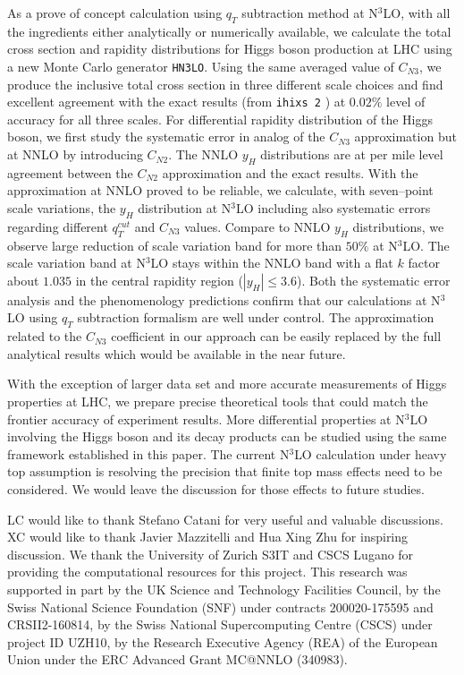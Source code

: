 \documentclass[12pt]{article}
\begin{document}
As a prove of concept calculation using $q_T$ subtraction method at N$^3$LO, with all the ingredients either analytically or numerically available, we calculate the total cross section and rapidity distributions for Higgs boson production at LHC using a new Monte Carlo generator \texttt{HN3LO}. Using the same averaged value of $C_{N3}$, we produce the inclusive total cross section in three different scale choices and find excellent agreement with the exact results (from \texttt{ihixs 2} \cite{Dulat:2018rbf})  at $0.02\%$ level of accuracy for all three scales. For differential rapidity distribution of the Higgs boson, we first study the systematic error in analog of the $C_{N3}$ approximation but at NNLO by introducing $C_{N2}$. The NNLO $y_H$ distributions are at per mile level agreement between the $C_{N2}$ approximation and the exact results. With the approximation at NNLO proved to be reliable, we calculate, with seven--point scale variations, the $y_H$ distribution at N$^3$LO including also systematic errors regarding different $q_T^{cut}$ and $C_{N3}$ values. Compare to NNLO $y_H$ distributions, we observe large reduction of scale variation band for more than $50\%$ at N$^3$LO. The scale variation band at N$^3$LO stays within the NNLO band with a flat $k$ factor about $1.035$ in the central rapidity region ($|y_H|\leq3.6$). Both the systematic error analysis and the phenomenology predictions confirm that our calculations at N$^3$LO using $q_T$ subtraction formalism are well under control. The approximation related to the $C_{N3}$ coefficient in our approach can be easily replaced by the full analytical results which would be available in the near future. 

With the exception of larger data set and more accurate measurements of Higgs properties at LHC, we prepare precise theoretical tools that could match the frontier accuracy of experiment results. More differential properties at N$^3$LO involving the Higgs boson and its decay products can be studied using the same framework established in this paper. The current N$^3$LO calculation under heavy top assumption is resolving the precision that finite top mass effects need to be considered. We would leave the discussion for those effects to future studies. 


LC would like to thank Stefano Catani for very useful and valuable discussions. XC would like to thank Javier Mazzitelli and Hua Xing Zhu for inspiring discussion. We thank the University of Zurich S3IT and CSCS Lugano for providing the computational resources for this project. This research was supported in part by the UK Science and Technology Facilities Council, by the Swiss National Science Foundation (SNF) under contracts 200020-175595 and CRSII2-160814, by the Swiss National Supercomputing Centre (CSCS) under project ID UZH10, by the Research Executive Agency (REA) of the European Union under the ERC Advanced Grant MC@NNLO (340983).
\end{document}
